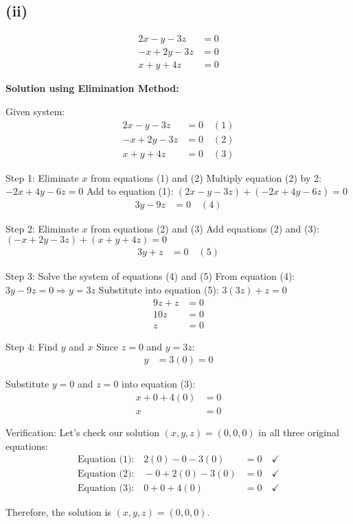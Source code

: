 \subsection*{(ii)}
\begin{align*}
	2x - y - 3z  & = 0 \\
	-x + 2y - 3z & = 0 \\
	x + y + 4z   & = 0
\end{align*}

\textbf{Solution using Elimination Method:}

Given system:
\begin{align}
	2x - y - 3z  & = 0 \quad (1) \\
	-x + 2y - 3z & = 0 \quad (2) \\
	x + y + 4z   & = 0 \quad (3)
\end{align}

Step 1: Eliminate $x$ from equations (1) and (2)
Multiply equation (2) by 2: $-2x + 4y - 6z = 0$
Add to equation (1): $(2x - y - 3z) + (-2x + 4y - 6z) = 0$
\begin{align}
	3y - 9z & = 0 \quad (4)
\end{align}

Step 2: Eliminate $x$ from equations (2) and (3)
Add equations (2) and (3): $(-x + 2y - 3z) + (x + y + 4z) = 0$
\begin{align}
	3y + z & = 0 \quad (5)
\end{align}

Step 3: Solve the system of equations (4) and (5)
From equation (4): $3y - 9z = 0 \Rightarrow y = 3z$
Substitute into equation (5): $3(3z) + z = 0$
\begin{align*}
	9z + z & = 0 \\
	10z    & = 0 \\
	z      & = 0
\end{align*}

Step 4: Find $y$ and $x$
Since $z = 0$ and $y = 3z$:
\begin{align*}
	y & = 3(0) = 0
\end{align*}

Substitute $y = 0$ and $z = 0$ into equation (3):
\begin{align*}
	x + 0 + 4(0) & = 0 \\
	x            & = 0
\end{align*}

Verification: Let's check our solution $(x, y, z) = (0, 0, 0)$ in all three original equations:
\begin{align*}
	\text{Equation (1):} \quad 2(0) - 0 - 3(0)  & = 0 \quad \checkmark \\
	\text{Equation (2):} \quad -0 + 2(0) - 3(0) & = 0 \quad \checkmark \\
	\text{Equation (3):} \quad 0 + 0 + 4(0)     & = 0 \quad \checkmark
\end{align*}

Therefore, the solution is $\boxed{(x, y, z) = (0, 0, 0)}$.
